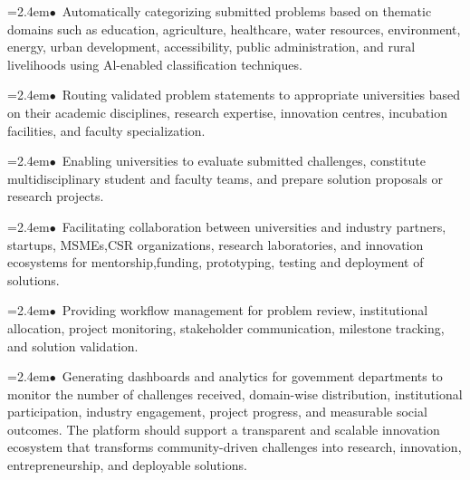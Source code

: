 \documentclass[10pt,a4paper]{article}
\begin{document}
\begin{tcolorbox}[pscard, title={"\textbf{SIH26043} \quad $\vert$ \quad A digital platform to crowdsource societal challenges and facilitate collab...}]
\noindent\hspace*{1.2em}\hangindent=2.4em\textcolor{sihblue}{$\bullet$}~\small Automatically categorizing submitted problems based on thematic domains such as education, agriculture, healthcare, water resources, environment, energy, urban development, accessibility, public administration, and rural livelihoods using Al-enabled classification techniques.\par\vspace{0.05cm}
\noindent\hspace*{1.2em}\hangindent=2.4em\textcolor{sihblue}{$\bullet$}~\small Routing validated problem statements to appropriate universities based on their academic disciplines, research expertise, innovation centres, incubation facilities, and faculty specialization.\par\vspace{0.05cm}
\noindent\hspace*{1.2em}\hangindent=2.4em\textcolor{sihblue}{$\bullet$}~\small Enabling universities to evaluate submitted challenges, constitute multidisciplinary student and faculty teams, and prepare solution proposals or research projects.\par\vspace{0.05cm}
\noindent\hspace*{1.2em}\hangindent=2.4em\textcolor{sihblue}{$\bullet$}~\small Facilitating collaboration between universities and industry partners, startups, MSMEs,CSR organizations, research laboratories, and innovation ecosystems for mentorship,funding, prototyping, testing and deployment of solutions.\par\vspace{0.05cm}
\noindent\hspace*{1.2em}\hangindent=2.4em\textcolor{sihblue}{$\bullet$}~\small Providing workflow management for problem review, institutional allocation, project monitoring, stakeholder communication, milestone tracking, and solution validation.\par\vspace{0.05cm}
\noindent\hspace*{1.2em}\hangindent=2.4em\textcolor{sihblue}{$\bullet$}~\small Generating dashboards and analytics for govemment departments to monitor the number of challenges received, domain-wise distribution, institutional participation, industry engagement, project progress, and measurable social outcomes. The platform should support a transparent and scalable innovation ecosystem that transforms community-driven challenges into research, innovation, entrepreneurship, and deployable solutions.\par\vspace{0.05cm}

\end{tcolorbox}
\end{document}
